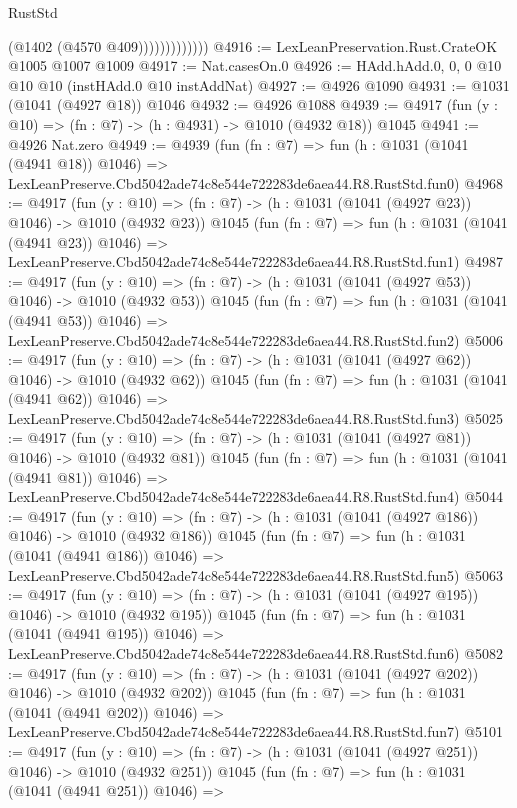 \begin{lexlean}{RustStd}
\begin{coremodule}
                          (@1402 (@4570 @409)))))))))))))
@4916 := LexLeanPreservation.Rust.CrateOK @1005 @1007 @1009
@4917 := Nat.casesOn.{0}
@4926 := HAdd.hAdd.{0, 0, 0} @10 @10 @10 (instHAdd.{0} @10 instAddNat)
@4927 := @4926 @1090
@4931 := @1031 (@1041 (@4927 @18)) @1046
@4932 := @4926 @1088
@4939 := @4917 (fun (y : @10) => (fn : @7) -> (h : @4931) -> @1010 (@4932 @18)) @1045
@4941 := @4926 Nat.zero
@4949 := @4939
    (fun (fn : @7) =>
    fun (h : @1031 (@1041 (@4941 @18)) @1046) =>
    LexLeanPreserve.Cbd5042ade74c8e544e722283de6aea44.R8.RustStd.fun0)
@4968 := @4917
    (fun (y : @10) => (fn : @7) -> (h : @1031 (@1041 (@4927 @23)) @1046) -> @1010 (@4932 @23))
    @1045
    (fun (fn : @7) =>
    fun (h : @1031 (@1041 (@4941 @23)) @1046) =>
    LexLeanPreserve.Cbd5042ade74c8e544e722283de6aea44.R8.RustStd.fun1)
@4987 := @4917
    (fun (y : @10) => (fn : @7) -> (h : @1031 (@1041 (@4927 @53)) @1046) -> @1010 (@4932 @53))
    @1045
    (fun (fn : @7) =>
    fun (h : @1031 (@1041 (@4941 @53)) @1046) =>
    LexLeanPreserve.Cbd5042ade74c8e544e722283de6aea44.R8.RustStd.fun2)
@5006 := @4917
    (fun (y : @10) => (fn : @7) -> (h : @1031 (@1041 (@4927 @62)) @1046) -> @1010 (@4932 @62))
    @1045
    (fun (fn : @7) =>
    fun (h : @1031 (@1041 (@4941 @62)) @1046) =>
    LexLeanPreserve.Cbd5042ade74c8e544e722283de6aea44.R8.RustStd.fun3)
@5025 := @4917
    (fun (y : @10) => (fn : @7) -> (h : @1031 (@1041 (@4927 @81)) @1046) -> @1010 (@4932 @81))
    @1045
    (fun (fn : @7) =>
    fun (h : @1031 (@1041 (@4941 @81)) @1046) =>
    LexLeanPreserve.Cbd5042ade74c8e544e722283de6aea44.R8.RustStd.fun4)
@5044 := @4917
    (fun (y : @10) => (fn : @7) -> (h : @1031 (@1041 (@4927 @186)) @1046) -> @1010 (@4932 @186))
    @1045
    (fun (fn : @7) =>
    fun (h : @1031 (@1041 (@4941 @186)) @1046) =>
    LexLeanPreserve.Cbd5042ade74c8e544e722283de6aea44.R8.RustStd.fun5)
@5063 := @4917
    (fun (y : @10) => (fn : @7) -> (h : @1031 (@1041 (@4927 @195)) @1046) -> @1010 (@4932 @195))
    @1045
    (fun (fn : @7) =>
    fun (h : @1031 (@1041 (@4941 @195)) @1046) =>
    LexLeanPreserve.Cbd5042ade74c8e544e722283de6aea44.R8.RustStd.fun6)
@5082 := @4917
    (fun (y : @10) => (fn : @7) -> (h : @1031 (@1041 (@4927 @202)) @1046) -> @1010 (@4932 @202))
    @1045
    (fun (fn : @7) =>
    fun (h : @1031 (@1041 (@4941 @202)) @1046) =>
    LexLeanPreserve.Cbd5042ade74c8e544e722283de6aea44.R8.RustStd.fun7)
@5101 := @4917
    (fun (y : @10) => (fn : @7) -> (h : @1031 (@1041 (@4927 @251)) @1046) -> @1010 (@4932 @251))
    @1045
    (fun (fn : @7) =>
    fun (h : @1031 (@1041 (@4941 @251)) @1046) =>

\end{coremodule}
\end{lexlean}
